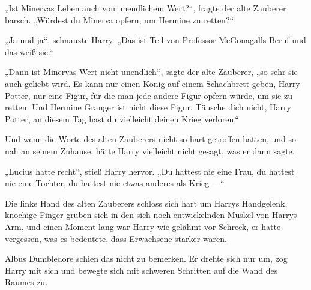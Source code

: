 „Ist Minervas Leben auch von unendlichem Wert?“, fragte der alte Zauberer barsch.
„Würdest du Minerva opfern, um Hermine zu retten?“

„Ja und ja“, schnauzte Harry.
„Das ist Teil von Professor McGonagalls Beruf und das weiß sie.“

„Dann ist Minervas Wert nicht unendlich“, sagte der alte Zauberer, „so sehr sie auch geliebt wird. Es kann nur einen König auf einem Schachbrett geben, Harry Potter, nur eine Figur, für die man jede andere Figur opfern würde, um sie zu retten. Und Hermine Granger ist nicht diese Figur. Täusche dich nicht, Harry Potter, an diesem Tag hast du vielleicht deinen Krieg verloren.“

Und wenn die Worte des alten Zauberers nicht so hart getroffen hätten, und so nah an seinem Zuhause, hätte Harry vielleicht nicht gesagt, was er dann sagte.

„Lucius hatte recht“, stieß Harry hervor.
„Du hattest nie eine Frau, du hattest nie eine Tochter, du hattest nie etwas anderes als Krieg —“

Die linke Hand des alten Zauberers schloss sich hart um Harrys Handgelenk, knochige Finger gruben sich in den sich noch entwickelnden Muskel von Harrys Arm, und einen Moment lang war Harry wie gelähmt vor Schreck, er hatte vergessen, was es bedeutete, dass Erwachsene stärker waren.

Albus Dumbledore schien das nicht zu bemerken. Er drehte sich nur um, zog Harry mit sich und bewegte sich mit schweren Schritten auf die Wand des Raumes zu.

